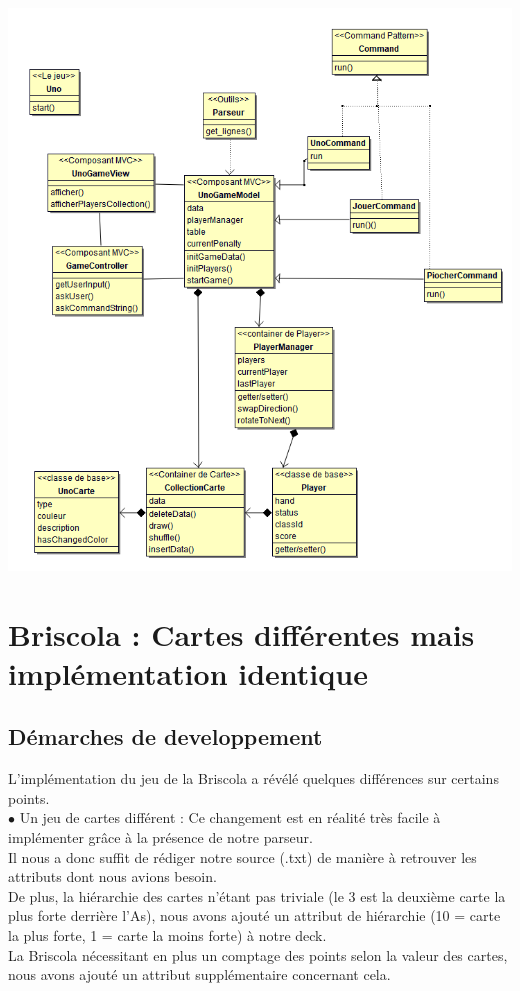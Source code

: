\documentclass[12pt, letterpaper]{article}
\begin{document}
\includegraphics[width=\linewidth]{uno.PNG}
 
\section{Briscola : Cartes différentes mais implémentation identique}
\subsection{Démarches de developpement}
L'implémentation du jeu de la Briscola a révélé quelques différences sur certains points.\\

$\bullet$ Un jeu de cartes différent : Ce changement est en réalité très facile à implémenter grâce à la présence de notre parseur.\\
Il nous a donc suffit de rédiger notre source (.txt) de manière à retrouver les attributs dont nous avions besoin.\\
De plus, la hiérarchie des cartes n'étant pas triviale (le 3 est la deuxième carte la plus forte derrière l'As), nous avons ajouté un attribut de hiérarchie (10 = carte la plus forte, 1 = carte la moins forte) à notre deck.\\
La Briscola nécessitant en plus un comptage des points selon la valeur des cartes, nous avons ajouté un attribut supplémentaire concernant cela.\\
\end{document}
